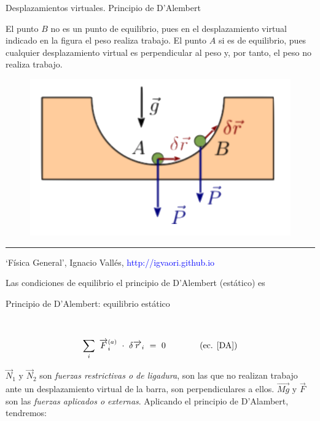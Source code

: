 \begin{myexampleblock}{Desplazamientos virtuales. Principio de D'Alembert}
\begin{multicols}{2}
\begin{small}
El punto $B$ no es un punto de equilibrio, pues en el desplazamiento virtual indicado en la figura el peso realiza trabajo. El punto $A$ si es de equilibrio, pues cualquier desplazamiento virtual es perpendicular al peso y, por tanto, el peso no realiza trabajo. 
\end{small}
\begin{figure}[H]
	\centering
	\includegraphics[width=.4\textwidth]{imagenes/img01-03.png}
\end{figure}
\end{multicols}

\begin{flushright}
\rule{200pt}{0.1pt}

\begin{scriptsize}
`Física General', Ignacio Vallés, \textcolor{blue}{http://igvaori.github.io}
\end{scriptsize}
\end{flushright}
\end{myexampleblock}

\vspace{0.5cm}
Las condiciones de equilibrio el principio de D'Alembert (estático) es

\vspace{5mm}
\begin{myalertblock}{Principio de D'Alembert: equilibrio estático}

$\,$

\begin{Large}
\begin{equation*}
\sum_i \ \overrightarrow F_i^{(a)} \ \cdot \ \var \overrightarrow r_i \ = \ 0  \qquad \qquad  \text{(ec. \ref{DA})}
\end{equation*}
\end{Large}
	
\end{myalertblock}

\vspace{1cm}
$\overrightarrow N_1 \text{ y } \overrightarrow N_2$ son \emph{fuerzas restrictivas o de ligadura}, son las que no realizan trabajo ante un desplazamiento virtual de la barra, son perpendiculares a ellos. $\overrightarrow{Mg} \text{ y } \overrightarrow F$ son las \emph{fuerzas aplicados o externas}. Aplicando el principio de D'Alambert, tendremos:

